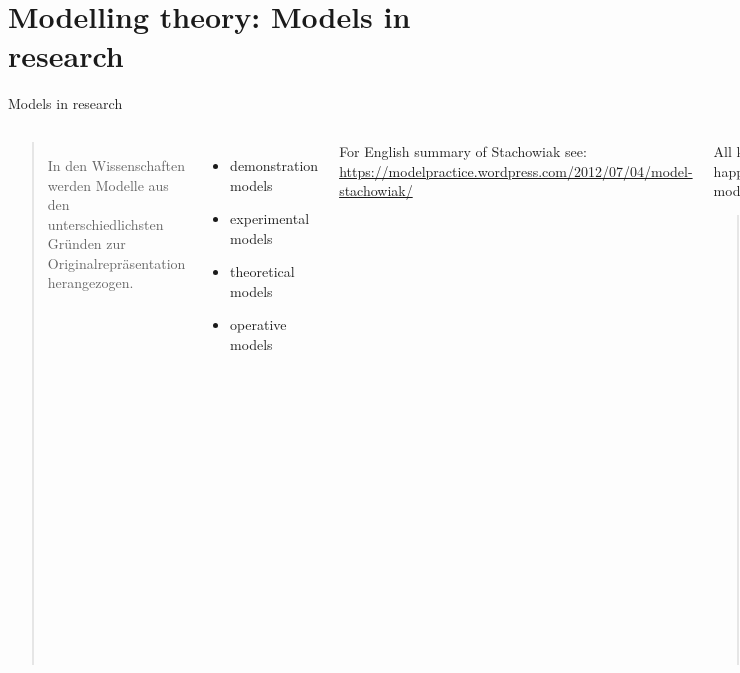 
\section{Modelling theory: Models in research}
\begin{frame}{Models in research}

  \begin{columns}%
        \begin{quote}
        In den Wissenschaften werden Modelle aus den unterschiedlichsten Gründen zur Originalrepräsentation herangezogen.~\parencite[138]{stachowiak}
    \end{quote}
    \bigskip
    
    \begin{itemize}
        \item demonstration models
        \item experimental models
        \item theoretical models
        \item operative models
    \end{itemize}
    \bigskip
    
    \footnotesize
    
    For English summary of Stachowiak see: \protect\url{https://modelpractice.wordpress.com/2012/07/04/model-stachowiak/}



      \begin{alertblock}{All knowledge production happens in the context of models}
        \begin{quote}
Der Gewinn dieser Vorgehensweise \lbrack{}Modellierung\rbrack{} liegt
auf der Hand: Modellseitig gewonnene Einsichten und
Fertigkeiten lassen sich -- bei Erfülltsein gewisser
Transferierungskriterien -- auf das Original übertragen,
der Modellbildner gewinnt neue Kenntnisse über das
modellierte Original, er bekommt dieses besser als
bisher in den Griff, kann es auf neue Weise
zweckdienlich umgestalten oder als verbessertes
Hilfsmittel für neue Aktionen verwenden.~\parencite[140]{stachowiak}
        \end{quote}
      \end{alertblock}
  \end{columns}
\end{frame}

